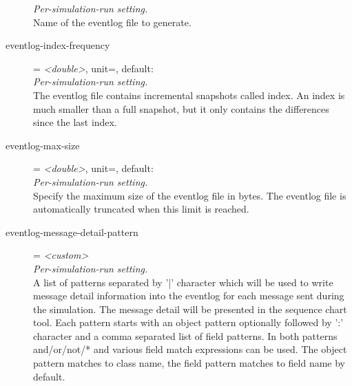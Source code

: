 \begin{description}
    \textit{Per-simulation-run setting.}\\
    Name of the eventlog file to generate.
\item[eventlog-index-frequency] = \textit{<double>}, unit=, default: \\
    \textit{Per-simulation-run setting.}\\
    The eventlog file contains incremental snapshots called index. An index is
    much smaller than a full snapshot, but it only contains the differences
    since the last index.
\item[eventlog-max-size] = \textit{<double>}, unit=, default: \\
    \textit{Per-simulation-run setting.}\\
    Specify the maximum size of the eventlog file in bytes. The eventlog file
    is automatically truncated when this limit is reached.
\item[eventlog-message-detail-pattern] = \textit{<custom>}\\
    \textit{Per-simulation-run setting.}\\
    A list of patterns separated by '|' character which will be used to write
    message detail information into the eventlog for each message sent during
    the simulation. The message detail will be presented in the sequence chart
    tool. Each pattern starts with an object pattern optionally followed by ':'
    character and a comma separated list of field patterns. In both patterns
    and/or/not/* and various field match expressions can be used. The object
    pattern matches to class name, the field pattern matches to field name by
    default.\\
     

\end{description}
